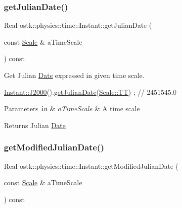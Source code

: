 \subsubsection{\texorpdfstring{get\+Julian\+Date()}{getJulianDate()}}
{\footnotesize\ttfamily Real ostk\+::physics\+::time\+::\+Instant\+::get\+Julian\+Date (\begin{DoxyParamCaption}\item[{const \hyperlink{namespaceostk_1_1physics_1_1time_adf23d37bd8641fb76a0e98ab46a70df7}{Scale} \&}]{a\+Time\+Scale }\end{DoxyParamCaption}) const}



Get Julian \hyperlink{classostk_1_1physics_1_1time_1_1_date}{Date} expressed in given time scale. 


\begin{DoxyCode}
\hyperlink{classostk_1_1physics_1_1time_1_1_instant_a3f84d0c2d0b140326d3b172b54e3ffff}{Instant::J2000}().\hyperlink{classostk_1_1physics_1_1time_1_1_instant_a71b3a5992123fddb3a3539dc99df66c1}{getJulianDate}(\hyperlink{namespaceostk_1_1physics_1_1time_adf23d37bd8641fb76a0e98ab46a70df7adf1f3edb9115acb0a1e04209b7a9937b}{Scale::TT}) ; \textcolor{comment}{// 2451545.0}
\end{DoxyCode}



\begin{DoxyParams}[1]{Parameters}
\mbox{\tt in}  & {\em a\+Time\+Scale} & A time scale \\
\hline
\end{DoxyParams}
\begin{DoxyReturn}{Returns}
Julian \hyperlink{classostk_1_1physics_1_1time_1_1_date}{Date} 
\end{DoxyReturn}
\mbox{\label{classostk_1_1physics_1_1time_1_1_instant_aeaaf152c806c5f98ad03933ede05fe2d}} 
\subsubsection{\texorpdfstring{get\+Modified\+Julian\+Date()}{getModifiedJulianDate()}}
{\footnotesize\ttfamily Real ostk\+::physics\+::time\+::\+Instant\+::get\+Modified\+Julian\+Date (\begin{DoxyParamCaption}\item[{const \hyperlink{namespaceostk_1_1physics_1_1time_adf23d37bd8641fb76a0e98ab46a70df7}{Scale} \&}]{a\+Time\+Scale }\end{DoxyParamCaption}) const}



